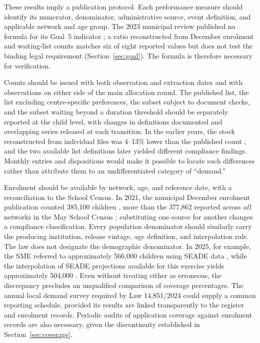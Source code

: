 These results imply a publication protocol. Each performance measure should identify its numerator, denominator, administrative source, event definition, and applicable network and age group. The 2023 municipal review published no formula for its Goal~5 indicator \citep{saopaulo2023conferencia}; a ratio reconstructed from December enrolment and waiting-list counts matches six of eight reported values but does not test the binding legal requirement (Section~\ref{sec:goal}). The formula is therefore necessary for verification.

Counts should be issued with both observation and extraction dates and with observations on either side of the main allocation round. The published list, the list excluding centre-specific preferences, the subset subject to document checks, and the subset waiting beyond a duration threshold should be separately reported at the child level, with changes in definitions documented and overlapping series released at each transition. In the earlier years, the stock reconstructed from individual files was 4--13\% lower than the published count \citep{sme_demanda_escolar}, and the two available list definitions later yielded different compliance findings. Monthly entries and dispositions would make it possible to locate such differences rather than attribute them to an undifferentiated category of ``demand.''

Enrolment should be available by network, age, and reference date, with a reconciliation to the School Census. In 2021, the municipal December enrolment publication counted 385,100 children \citep{sme_demanda_escolar}, more than the 377,862 reported across \emph{all} networks in the May School Census \citep{inep_censo_escolar_c}; substituting one source for another changes a compliance classification. Every population denominator should similarly carry the producing institution, release vintage, age definition, and interpolation rule. The law does not designate the demographic denominator. In 2025, for example, the SME referred to approximately 566,000 children using SEADE data \citep{sme2025filazerada}, while the interpolation of SEADE projections available for this exercise yields approximately 504,000 \citep{seade_idade_escolar}. Even without treating either as erroneous, the discrepancy precludes an unqualified comparison of coverage percentages. The annual local demand survey required by Law 14,851/2024 \citep{brasil2024lei14851} could supply a common reporting schedule, provided its results are linked transparently to the register and enrolment records. Periodic audits of application coverage against enrolment records are also necessary, given the discontinuity established in Section~\ref{sec:coverage}.

